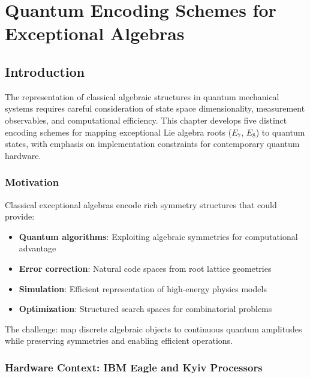 
\chapter{Quantum Encoding Schemes for Exceptional Algebras}
\label{ch:quantum_encoding}

\section{Introduction}

The representation of classical algebraic structures in quantum mechanical systems requires careful consideration of state space dimensionality, measurement observables, and computational efficiency. This chapter develops five distinct encoding schemes for mapping exceptional Lie algebra roots ($E_7$, $E_8$) to quantum states, with emphasis on implementation constraints for contemporary quantum hardware.

\subsection{Motivation}

Classical exceptional algebras encode rich symmetry structures that could provide:
\begin{itemize}
    \item \textbf{Quantum algorithms}: Exploiting algebraic symmetries for computational advantage
    \item \textbf{Error correction}: Natural code spaces from root lattice geometries
    \item \textbf{Simulation}: Efficient representation of high-energy physics models
    \item \textbf{Optimization}: Structured search spaces for combinatorial problems
\end{itemize}

The challenge: map discrete algebraic objects to continuous quantum amplitudes while preserving symmetries and enabling efficient operations.

\subsection{Hardware Context: IBM Eagle and Kyiv Processors}

